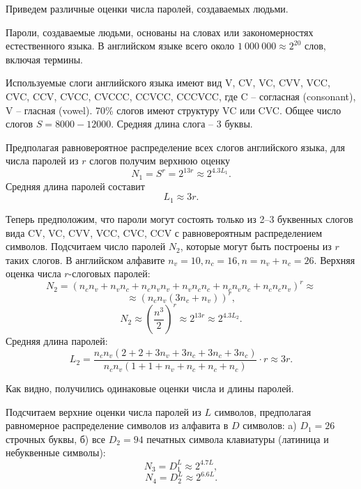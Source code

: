 \documentclass[10pt,a4paper]{book}
\begin{document}
Приведем различные оценки числа паролей, создаваемых людьми.

Пароли, создаваемые людьми, основаны на словах или закономерностях естественного языка. В английском языке всего около $1\ 000\ 000 \approx 2^{20}$ слов, включая термины.


Используемые слоги английского языка имеют вид V, CV, VC, CVV, VCC, CVC, CCV, CVCC, CVCCC, CCVCC, CCCVCC, где C -- согласная (consonant), V -- гласная (vowel). 70\% слогов имеют структуру VC или CVC. Общее число слогов $S = 8000 - 12000$. Средняя длина слога -- 3 буквы.

Предполагая равновероятное распределение всех слогов английского языка, для числа паролей из $r$ слогов получим верхнюю оценку
    \[ N_1 = S^r = 2^{13 r} \approx 2^{4.3 L_1}. \]
Средняя длина паролей составит
    \[ L_1 \approx 3 r. \]

Теперь предположим, что пароли могут состоять только из 2--3 буквенных слогов вида CV, VC, CVV, VCC, CVC, CCV с равновероятным распределением символов. Подсчитаем число паролей $N_2$, которые могут быть построены из $r$ таких слогов. В английском алфавите $n_v = 10, n_c = 16, n = n_v + n_c = 26$. Верхняя оценка числа $r$-слоговых паролей:
    \[ N_2 = (n_c n_v + n_v n_c + n_c n_v n_v + n_v n_c n_c + n_c n_v n_c + n_c n_c n_v)^r \approx \]
        \[ \approx \left( n_c n_v(3 n_c + n_v) \right)^r, \]
    \[ N_2 \approx \left( \frac{n^3}{2} \right)^r \approx 2^{13 r} \approx 2^{4.3 L_2}. \]
Средняя длина паролей:
    \[ L_2 = \frac{n_c n_v(2 + 2 + 3 n_v + 3 n_c + 3 n_c + 3 n_c)}{n_c n_v (1 + 1 + n_v + n_c + n_c + n_c)} \cdot r \approx 3 r. \]

Как видно, получились одинаковые оценки числа и длины паролей.

Подсчитаем верхние оценки числа паролей из $L$ символов, предполагая равномерное распределение символов из алфавита в $D$ символов: a) $D_1 = 26$ строчных буквы, б) все $D_2 = 94$ печатных символа клавиатуры (латиница и небуквенные символы):
    \[ N_3 = D_1^L \approx 2^{4.7 L}, \]
    \[ N_4 = D_2^L \approx 2^{6.6 L}. \]
\end{document}
